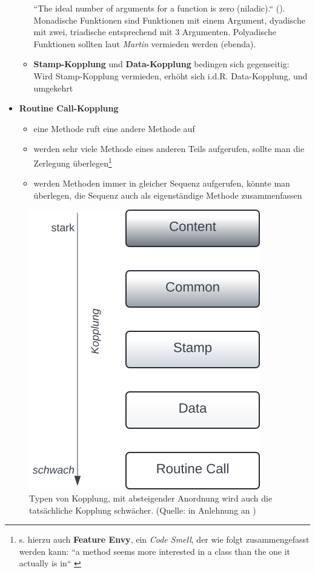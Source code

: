 \begin{itemize}
\begin{itemize}
{    ``The ideal number of arguments for a function is zero (niladic).`` (\cite[40]{Mar08}). Monadische Funktionen sind Funktionen mit einem Argument, dyadische mit zwei, triadische entsprechend mit 3 Argumenten. Polyadische Funktionen sollten laut \textit{Martin} vermieden werden (ebenda).
    }
    \item \textbf{Stamp-Kopplung} und \textbf{Data-Kopplung} bedingen sich gegenseitig: Wird Stamp-Kopplung vermieden, erhöht sich i.d.R. Data-Kopplung, und umgekehrt
    \end{itemize}
    \item \textbf{Routine Call-Kopplung}
    \begin{itemize}
    \item eine Methode ruft eine andere Methode auf
    \item werden sehr viele Methode eines anderen Teils aufgerufen, sollte man die Zerlegung überlegen\footnote{
    s. hierzu auch \textbf{Feature Envy}, ein \textit{Code Smell}, der wie folgt zusammengefasst werden kann: ``a method seems more interested in a class than the one it actually is in`` \cite[80 f.]{Fow99}
    }
    \item werden Methoden immer in gleicher Sequenz aufgerufen, könnte man überlegen, die Sequenz auch als eigenständige Methode zusammenfassen
    \end{itemize}
\end{itemize}

\begin{figure}
    \centering
    \includegraphics[scale=0.4]{part two/Objektorientierter Entwurf/img/kopplung}
    \caption{Typen von Kopplung, mit absteigender Anordnung wird auch die tatsächliche Kopplung schwächer.  (Quelle: in Anlehnung an \cite[73, Abb. 3.18]{Wed09b})}
    \label{fig:kopplung}
\end{figure}

